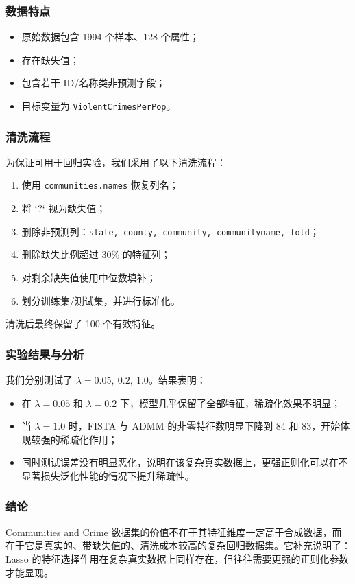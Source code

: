 \documentclass[12pt,a4paper]{ctexart}
\begin{document}
\subsubsection{数据特点}
\begin{itemize}[leftmargin=2em]
    \item 原始数据包含 1994 个样本、128 个属性；
    \item 存在缺失值；
    \item 包含若干 ID/名称类非预测字段；
    \item 目标变量为 \texttt{ViolentCrimesPerPop}。
\end{itemize}

\subsubsection{清洗流程}
为保证可用于回归实验，我们采用了以下清洗流程：
\begin{enumerate}[label=\arabic*.]
    \item 使用 \texttt{communities.names} 恢复列名；
    \item 将 `?` 视为缺失值；
    \item 删除非预测列：\texttt{state, county, community, communityname, fold}；
    \item 删除缺失比例超过 30\% 的特征列；
    \item 对剩余缺失值使用中位数填补；
    \item 划分训练集/测试集，并进行标准化。
\end{enumerate}

清洗后最终保留了 100 个有效特征。

\subsubsection{实验结果与分析}
我们分别测试了 $\lambda=0.05,\ 0.2,\ 1.0$。结果表明：
\begin{itemize}[leftmargin=2em]
    \item 在 $\lambda=0.05$ 和 $\lambda=0.2$ 下，模型几乎保留了全部特征，稀疏化效果不明显；
    \item 当 $\lambda=1.0$ 时，FISTA 与 ADMM 的非零特征数明显下降到 84 和 83，开始体现较强的稀疏化作用；
    \item 同时测试误差没有明显恶化，说明在该复杂真实数据上，更强正则化可以在不显著损失泛化性能的情况下提升稀疏性。
\end{itemize}

\subsubsection{结论}
Communities and Crime 数据集的价值不在于其特征维度一定高于合成数据，而在于它是真实的、带缺失值的、清洗成本较高的复杂回归数据集。它补充说明了：Lasso 的特征选择作用在复杂真实数据上同样存在，但往往需要更强的正则化参数才能显现。
\end{document}
